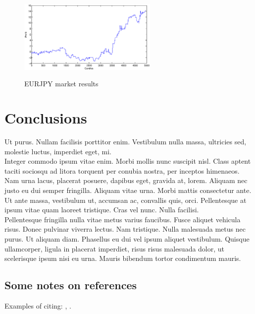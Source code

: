 \documentclass{tewiart}
\begin{document}
\begin{figure}[h]
\begin{minipage}{.49\linewidth}
\label{mansard}
\end{minipage}
\begin{minipage}{\linewidth}
\centering 
\includegraphics[width=0.6\textwidth]{S1s.eps}
\label{mansard}
\end{minipage}
\caption{EURJPY market results}
\end{figure}
\FloatBarrier

\section{Conclusions}
Ut purus. Nullam facilisis porttitor enim. Vestibulum nulla massa, ultricies
sed, molestie luctus, imperdiet eget, mi. \\
\indent Integer commodo ipsum vitae enim. Morbi mollis nunc suscipit nisl.
Class aptent taciti sociosqu ad litora torquent per conubia nostra, per
inceptos himenaeos. Nam urna lacus, placerat posuere, dapibus eget, gravida
at, lorem. Aliquam nec justo eu dui semper fringilla. Aliquam vitae urna.
Morbi mattis consectetur ante. Ut ante massa, vestibulum ut, accumsan ac,
convallis quis, orci. Pellentesque at ipsum vitae quam laoreet tristique. Cras
vel nunc. Nulla facilisi.\\
\indent Pellentesque fringilla nulla vitae metus varius faucibus. Fusce aliquet
vehicula risus. Donec pulvinar viverra lectus. Nam tristique. Nulla malesuada
metus nec purus. Ut aliquam diam. Phasellus eu dui vel ipsum aliquet
vestibulum. Quisque ullamcorper, ligula in placerat imperdiet, risus risus
malesuada dolor, ut scelerisque ipsum nisi eu urna. Mauris bibendum tortor
condimentum mauris.  


\subsection{Some notes on references}\label{bib}
Examples of citing: \cite{wilinski09}, \cite{wilinski09,
tian02, satchwell05}. 




\end{document}
